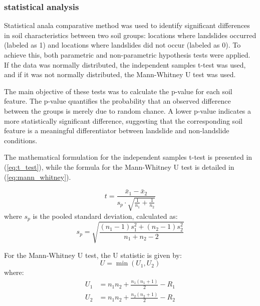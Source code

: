\subsubsection{statistical analysis}
Statistical anala comparative method was used to identify significant differences in soil characteristics between two soil groups: locations where landslides occurred (labeled as 1) and locations where landslides did not occur (labeled as 0). To achieve this, both parametric and non-parametric hypothesis tests were applied. If the data was normally distributed, the independent samples t-test was used, and if it was not normally distributed, the Mann-Whitney U test was used\cite{mthd04}.

The main objective of these tests was to calculate the p-value for each soil feature. The p-value quantifies the probability that an observed difference between the groups is merely due to random chance. A lower p-value indicates a more statistically significant difference, suggesting that the corresponding soil feature is a meaningful differentiator between landslide and non-landslide conditions.

The mathematical formulation for the independent samples t-test is presented in (\ref{eq:t_test}), while the formula for the Mann-Whitney U test is detailed in (\ref{eq:mann_whitney}).

\begin{equation} \label{eq:t_test}
t = \frac{\bar{x}_1 - \bar{x}_2}{s_p \cdot \sqrt{\frac{1}{n_1} + \frac{1}{n_2}}}
\end{equation}
where $s_p$ is the pooled standard deviation, calculated as:
\begin{equation} \label{eq:sp_pooled}
s_p = \sqrt{\frac{(n_1 - 1)s_1^2 + (n_2 - 1)s_2^2}{n_1 + n_2 - 2}}
\end{equation}

For the Mann-Whitney U test, the U statistic is given by:
\begin{equation} \label{eq:mann_whitney}
U = \min(U_1, U_2)
\end{equation}
where:
\begin{align}
U_1 &= n_1n_2 + \frac{n_1(n_1 + 1)}{2} - R_1 \label{eq:U1} \\
U_2 &= n_1n_2 + \frac{n_2(n_2 + 1)}{2} - R_2 \label{eq:U2}
\end{align}
